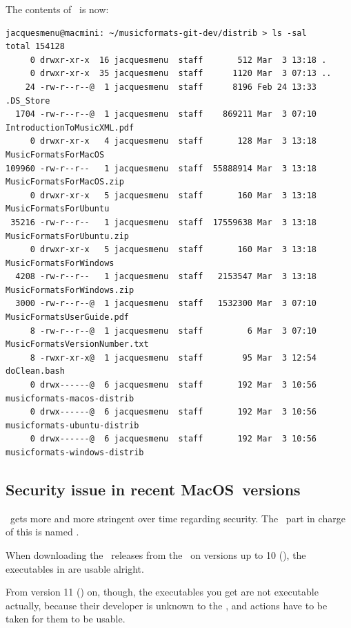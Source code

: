 The contents of \distrib\ is now:
\begin{lstlisting}[language=Terminal]
jacquesmenu@macmini: ~/musicformats-git-dev/distrib > ls -sal
total 154128
     0 drwxr-xr-x  16 jacquesmenu  staff       512 Mar  3 13:18 .
     0 drwxr-xr-x  35 jacquesmenu  staff      1120 Mar  3 07:13 ..
    24 -rw-r--r--@  1 jacquesmenu  staff      8196 Feb 24 13:33 .DS_Store
  1704 -rw-r--r--@  1 jacquesmenu  staff    869211 Mar  3 07:10 IntroductionToMusicXML.pdf
     0 drwxr-xr-x   4 jacquesmenu  staff       128 Mar  3 13:18 MusicFormatsForMacOS
109960 -rw-r--r--   1 jacquesmenu  staff  55888914 Mar  3 13:18 MusicFormatsForMacOS.zip
     0 drwxr-xr-x   5 jacquesmenu  staff       160 Mar  3 13:18 MusicFormatsForUbuntu
 35216 -rw-r--r--   1 jacquesmenu  staff  17559638 Mar  3 13:18 MusicFormatsForUbuntu.zip
     0 drwxr-xr-x   5 jacquesmenu  staff       160 Mar  3 13:18 MusicFormatsForWindows
  4208 -rw-r--r--   1 jacquesmenu  staff   2153547 Mar  3 13:18 MusicFormatsForWindows.zip
  3000 -rw-r--r--@  1 jacquesmenu  staff   1532300 Mar  3 07:10 MusicFormatsUserGuide.pdf
     8 -rw-r--r--@  1 jacquesmenu  staff         6 Mar  3 07:10 MusicFormatsVersionNumber.txt
     8 -rwxr-xr-x@  1 jacquesmenu  staff        95 Mar  3 12:54 doClean.bash
     0 drwx------@  6 jacquesmenu  staff       192 Mar  3 10:56 musicformats-macos-distrib
     0 drwx------@  6 jacquesmenu  staff       192 Mar  3 10:56 musicformats-ubuntu-distrib
     0 drwx------@  6 jacquesmenu  staff       192 Mar  3 10:56 musicformats-windows-distrib
\end{lstlisting}


\subsection{Security issue in recent MacOS\texttrademark\ versions}

\MacOS\ gets more and more stringent over time regarding security. The \OS\ part in charge of this is named \Gatekeeper.

When downloading the \mf\ releases from the \repo\ on versions up to 10 (), the executables in  are usable alright.

From version 11 () on, though, the executables you get are not executable actually, because their developer is unknown to the \OS, and actions have to be taken for them to be usable.

